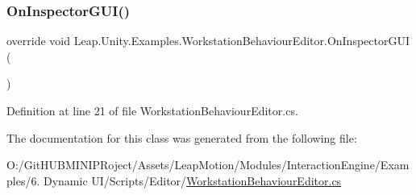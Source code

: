 \subsubsection{\texorpdfstring{OnInspectorGUI()}{OnInspectorGUI()}}
{\footnotesize\ttfamily override void Leap.\+Unity.\+Examples.\+Workstation\+Behaviour\+Editor.\+On\+Inspector\+G\+UI (\begin{DoxyParamCaption}{ }\end{DoxyParamCaption})}



Definition at line 21 of file Workstation\+Behaviour\+Editor.\+cs.



The documentation for this class was generated from the following file\+:\begin{DoxyCompactItemize}
\item 
O\+:/\+Git\+H\+U\+B\+M\+I\+N\+I\+P\+Roject/\+Assets/\+Leap\+Motion/\+Modules/\+Interaction\+Engine/\+Examples/6. Dynamic U\+I/\+Scripts/\+Editor/\mbox{\hyperlink{_workstation_behaviour_editor_8cs}{Workstation\+Behaviour\+Editor.\+cs}}\end{DoxyCompactItemize}

